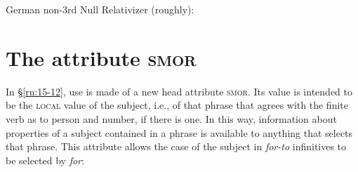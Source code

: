 \documentclass[output=paper]{LSP/langsci}
\begin{document}
\pagebreak
\randnum\label{rn:15-12}German non-3rd Null Relativizer (roughly):
\begin{exe}
\ex
{}
\end{exe}

\section{The attribute \textsc{smor}}

\largerpage
\randnum\label{rn:15-13}In §\ref{rn:15-12}, use is made of a new head attribute \textsc{smor}. Its value is
intended to be the \textsc{local} value of the subject, i.e., of that phrase
that agrees with the finite verb as to person and number, if there is
one. In this way, information about properties of a subject contained
in a phrase is available to anything that selects that phrase. This
attribute allows the case of the subject in \textit{for-to} infinitives to be
selected by \textit{for}:
\end{document}
